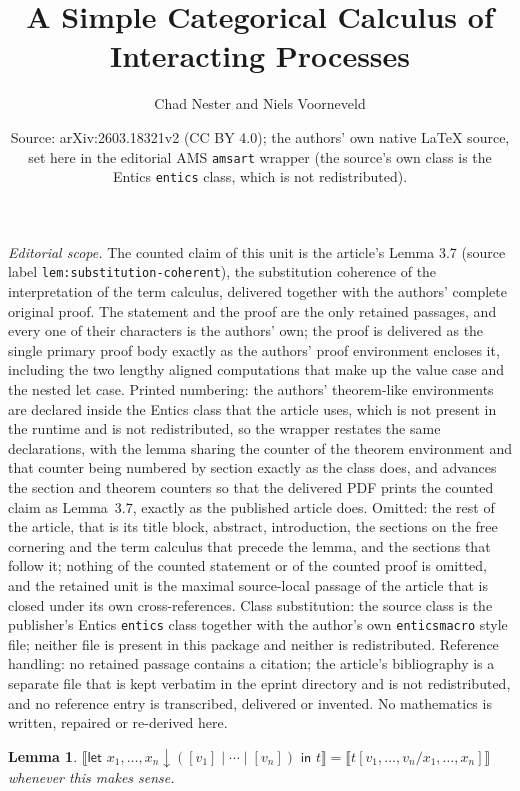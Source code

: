 \documentclass[10pt,a4paper]{amsart}
\title{A Simple Categorical Calculus of Interacting Processes}
\author{Chad Nester and Niels Voorneveld}
\date{Source: arXiv:2603.18321v2 (CC BY 4.0); the authors' own native \LaTeX{} source, set here in the editorial AMS \texttt{amsart} wrapper (the source's own class is the Entics \texttt{entics} class, which is not redistributed).}
\theoremstyle{plain}
\newtheorem{lemma}[thm]{Lemma}
\newcommand{\asn}{\downarrow}
\newcommand{\seq}{,\!\ldots\!,}
\begin{document}
\maketitle
\noindent\textit{Editorial scope.} The counted claim of this unit is the article's Lemma 3.7 (source label \texttt{lem:substitution-coherent}), the substitution coherence of the interpretation of the term calculus, delivered together with the authors' complete original proof. The statement and the proof are the only retained passages, and every one of their characters is the authors' own; the proof is delivered as the single primary proof body exactly as the authors' proof environment encloses it, including the two lengthy aligned computations that make up the value case and the nested let case. Printed numbering: the authors' theorem-like environments are declared inside the Entics class that the article uses, which is not present in the runtime and is not redistributed, so the wrapper restates the same declarations, with the lemma sharing the counter of the theorem environment and that counter being numbered by section exactly as the class does, and advances the section and theorem counters so that the delivered PDF prints the counted claim as Lemma~3.7, exactly as the published article does. Omitted: the rest of the article, that is its title block, abstract, introduction, the sections on the free cornering and the term calculus that precede the lemma, and the sections that follow it; nothing of the counted statement or of the counted proof is omitted, and the retained unit is the maximal source-local passage of the article that is closed under its own cross-references. Class substitution: the source class is the publisher's Entics \texttt{entics} class together with the author's own \texttt{enticsmacro} style file; neither file is present in this package and neither is redistributed. Reference handling: no retained passage contains a citation; the article's bibliography is a separate file that is kept verbatim in the eprint directory and is not redistributed, and no reference entry is transcribed, delivered or invented. No mathematics is written, repaired or re-derived here.

\setcounter{section}{3}
\setcounter{thm}{6}
\begin{lemma}\label{lem:substitution-coherent}
  $\llbracket \textsf{let } x_1 \seq x_n \asn ([v_1] \mid \cdots \mid [v_n]) \textsf{ in } t \rrbracket = \llbracket t[v_1 \seq v_n / x_1 \seq x_n]\rrbracket$ whenever this makes sense.
\end{lemma}
\end{document}
